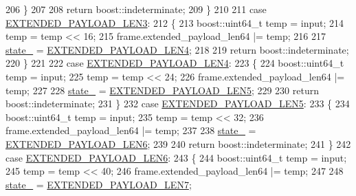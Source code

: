 \begin{DoxyCode}
206                 \}
207 
208                 \textcolor{keywordflow}{return} boost::indeterminate;
209             \}
210 
211         \textcolor{keywordflow}{case} \hyperlink{classwebsocket_1_1DataframeParser_a2285d0f76dcfd6dadbe70a78c5e3de8aa3378e509de505a563f329a988e7b25e5}{EXTENDED\_PAYLOAD\_LEN3}:
212             \{
213                 boost::uint64\_t temp = input;
214                 temp = temp << 16;
215                 frame.extended\_payload\_len64 |= temp;
216 
217                 \hyperlink{classwebsocket_1_1DataframeParser_a46525ab8a38ba649b49faa6bf3b0c959}{state\_} = \hyperlink{classwebsocket_1_1DataframeParser_a2285d0f76dcfd6dadbe70a78c5e3de8aa79a2813ac6e13fe0c88042739cc877dd}{EXTENDED\_PAYLOAD\_LEN4};
218 
219                 \textcolor{keywordflow}{return} boost::indeterminate;
220             \}
221 
222         \textcolor{keywordflow}{case} \hyperlink{classwebsocket_1_1DataframeParser_a2285d0f76dcfd6dadbe70a78c5e3de8aa79a2813ac6e13fe0c88042739cc877dd}{EXTENDED\_PAYLOAD\_LEN4}:
223             \{
224                 boost::uint64\_t temp = input;
225                 temp = temp << 24;
226                 frame.extended\_payload\_len64 |= temp;
227 
228                 \hyperlink{classwebsocket_1_1DataframeParser_a46525ab8a38ba649b49faa6bf3b0c959}{state\_} = \hyperlink{classwebsocket_1_1DataframeParser_a2285d0f76dcfd6dadbe70a78c5e3de8aadde851b7d820e146ca0c1e00131f6efb}{EXTENDED\_PAYLOAD\_LEN5};
229 
230                 \textcolor{keywordflow}{return} boost::indeterminate;
231             \}
232         \textcolor{keywordflow}{case} \hyperlink{classwebsocket_1_1DataframeParser_a2285d0f76dcfd6dadbe70a78c5e3de8aadde851b7d820e146ca0c1e00131f6efb}{EXTENDED\_PAYLOAD\_LEN5}:
233             \{
234                 boost::uint64\_t temp = input;
235                 temp = temp << 32;
236                 frame.extended\_payload\_len64 |= temp;
237 
238                 \hyperlink{classwebsocket_1_1DataframeParser_a46525ab8a38ba649b49faa6bf3b0c959}{state\_} = \hyperlink{classwebsocket_1_1DataframeParser_a2285d0f76dcfd6dadbe70a78c5e3de8aa95998dd95ec2eed1d3e9e3d43db4ae1c}{EXTENDED\_PAYLOAD\_LEN6};
239 
240                 \textcolor{keywordflow}{return} boost::indeterminate;
241             \}
242         \textcolor{keywordflow}{case} \hyperlink{classwebsocket_1_1DataframeParser_a2285d0f76dcfd6dadbe70a78c5e3de8aa95998dd95ec2eed1d3e9e3d43db4ae1c}{EXTENDED\_PAYLOAD\_LEN6}:
243             \{
244                 boost::uint64\_t temp = input;
245                 temp = temp << 40;
246                 frame.extended\_payload\_len64 |= temp;
247 
248                 \hyperlink{classwebsocket_1_1DataframeParser_a46525ab8a38ba649b49faa6bf3b0c959}{state\_} = \hyperlink{classwebsocket_1_1DataframeParser_a2285d0f76dcfd6dadbe70a78c5e3de8aa1cfc14be739e979f81d64b02ab16eb9f}{EXTENDED\_PAYLOAD\_LEN7};

\end{DoxyCode}
